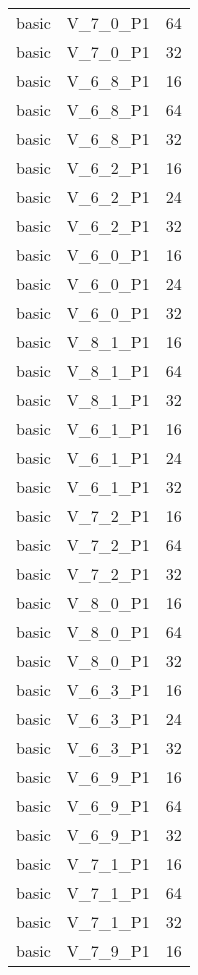 \begin{longtable}{|c|c|c|}
            basic & V\_7\_0\_P1 & 64 \\
            basic & V\_7\_0\_P1 & 32 \\
            basic & V\_6\_8\_P1 & 16 \\
            basic & V\_6\_8\_P1 & 64 \\
            basic & V\_6\_8\_P1 & 32 \\
            basic & V\_6\_2\_P1 & 16 \\
            basic & V\_6\_2\_P1 & 24 \\
            basic & V\_6\_2\_P1 & 32 \\
            basic & V\_6\_0\_P1 & 16 \\
            basic & V\_6\_0\_P1 & 24 \\
            basic & V\_6\_0\_P1 & 32 \\
            basic & V\_8\_1\_P1 & 16 \\
            basic & V\_8\_1\_P1 & 64 \\
            basic & V\_8\_1\_P1 & 32 \\
            basic & V\_6\_1\_P1 & 16 \\
            basic & V\_6\_1\_P1 & 24 \\
            basic & V\_6\_1\_P1 & 32 \\
            basic & V\_7\_2\_P1 & 16 \\
            basic & V\_7\_2\_P1 & 64 \\
            basic & V\_7\_2\_P1 & 32 \\
            basic & V\_8\_0\_P1 & 16 \\
            basic & V\_8\_0\_P1 & 64 \\
            basic & V\_8\_0\_P1 & 32 \\
            basic & V\_6\_3\_P1 & 16 \\
            basic & V\_6\_3\_P1 & 24 \\
            basic & V\_6\_3\_P1 & 32 \\
            basic & V\_6\_9\_P1 & 16 \\
            basic & V\_6\_9\_P1 & 64 \\
            basic & V\_6\_9\_P1 & 32 \\
            basic & V\_7\_1\_P1 & 16 \\
            basic & V\_7\_1\_P1 & 64 \\
            basic & V\_7\_1\_P1 & 32 \\
            basic & V\_7\_9\_P1 & 16 \\

\end{longtable}
